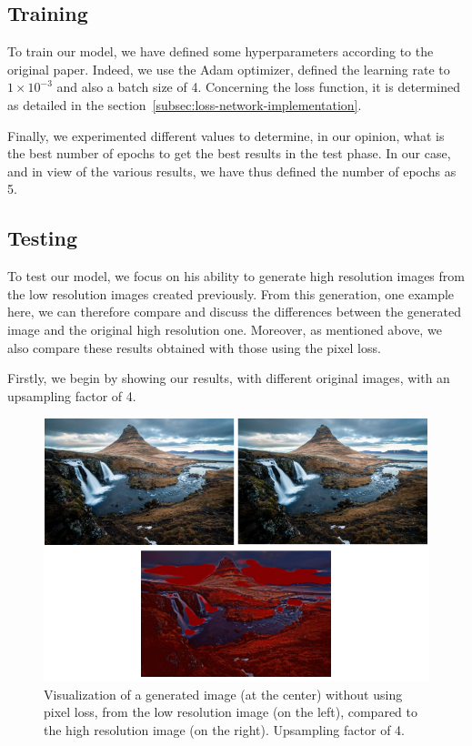 \documentclass{article}
\begin{document}
{    \subsection{Training}
    \label{subsec:training}

    To train our model, we have defined some hyperparameters according to the original paper. Indeed, we use the Adam optimizer, defined the learning rate to $1 \times 10^{-3}$ and also a batch size of 4.
    Concerning the loss function, it is determined as detailed in the section~\ref{subsec:loss-network-implementation}.
    
    Finally, we experimented different values to determine, in our opinion, what is the best number of epochs to get the best results in the test phase. In our case, and in view of the various results, we have thus defined the number of epochs as 5.
    
    \subsection{Testing}
    \label{subsec:testing}

    To test our model, we focus on his ability to generate high resolution images from the low resolution images created previously. From this generation, one example here, we can therefore compare and discuss the differences between the generated image and the original high resolution one. Moreover, as mentioned above, we also compare these results obtained with those using the pixel loss. 
    
    Firstly, we begin by showing our results, with different original images, with an upsampling factor of 4.

     \begin{figure}[ht]
        \centering
        \includegraphics[width=0.5\textheight]{images/scaling_factor-4_without_pixel_loss.png}
        \caption{Visualization of a generated image (at the center) without using pixel loss, from the low resolution image (on the left), compared to the high resolution image (on the right). Upsampling factor of 4.}
        \label{fig:scaling_factor_4_without_pixel_loss}
    \end{figure}
    
}
\end{document}
